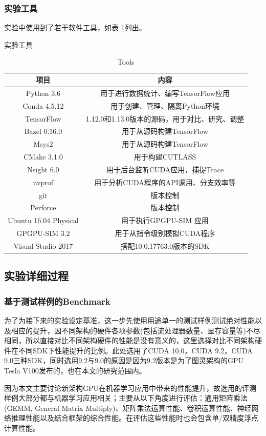 \subsubsection{实验工具}
\par 实验中使用到了若干软件工具，如表 \ref{table-实验工具}列出。
\begin{table}
	\centering
	\renewcommand{\thetable}{\arabic{section}-\arabic{table} }
	\renewcommand{\tablename}{表}
	\caption{实验工具}
	\addtocounter{table}{-1}
	\renewcommand{\thetable}{\arabic{section}-\arabic{table} }
	\renewcommand{\tablename}{Table}
	\caption{Tools}
	\begin{tabular}{cc}
		\toprule
		项目	&	内容\\
		\midrule
		Python 3.6		&	用于进行数据统计、编写TensorFlow应用\\
		Conda 4.5.12		&	用于创建、管理、隔离Python环境\\
		TensorFlow		&	1.12.0和1.13.0版本的源码，用于对比、研究、调整\\
		Bazel 0.16.0		&	用于从源码构建TensorFlow\\
		Msys2		&	用于从源码构建TensorFlow\\
		CMake 3.1.0		&	用于构建CUTLASS\\	
		Nsight 6.0	&	用于后台监听CUDA应用，捕捉Trace\\
		nvprof		&	用于分析CUDA程序的API调用、分支效率等\\
		git			&	版本控制\\
		Perforce	&	版本控制\\
		Ubuntu 16.04 Physical & 用于执行GPGPU-SIM 应用\\
		GPGPU-SIM 3.2 & 用于从指令级别模拟CUDA程序\\
		Visual Studio 2017 & 搭配10.0.17763.0版本的SDK\\
		\bottomrule
	\end{tabular} \label{table-实验工具} 
\end{table}
\subsection{实验详细过程}
\subsubsection{基于测试样例的Benchmark}
\par 为了为接下来的实验设定基准，这一步先使用用途单一的测试样例测试绝对性能以及相应的提升，因不同架构的硬件各项参数(包括流处理器数量、显存容量等)不尽相同，所以直接对比不同架构硬件的性能是没有意义的，这里选择对比不同架构硬件在不同SDK下性能提升的比例。此处选用了CUDA 10.0，CUDA 9.2，CUDA 9.0三种SDK，同时选用9.2与9.0的原因是因为9.2版本是为了图灵架构的GPU Tesla V100发布的\cite{CUDA92}，也在本文的研究范围内。
\par 因为本文主要讨论新架构GPU在机器学习应用中带来的性能提升，故选用的评测样例大部分都与机器学习应用相关；主要从以下角度进行评估：通用矩阵乘法(GEMM, General Matrix Multiply)、矩阵乘法运算性能、卷积运算性能、神经网络推理性能以及结合框架的综合性能。在评估这些性能时也会包含单/双精度浮点计算性能。
